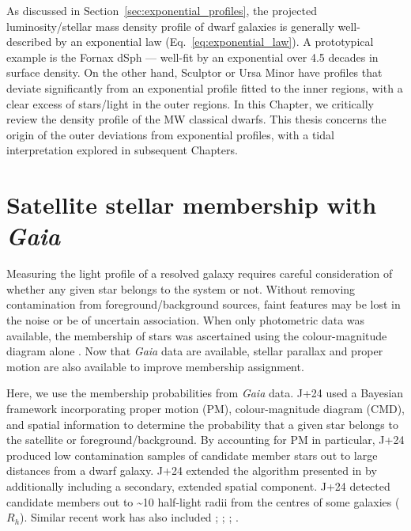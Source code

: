 As discussed in Section~\ref{sec:exponential_profiles}, the projected
luminosity/stellar mass density profile of dwarf galaxies is generally
well-described by an exponential law (Eq.~\ref{eq:exponential_law}). A
prototypical example is the Fornax dSph --- well-fit by an exponential
over 4.5 decades in surface density. On the other hand, Sculptor or Ursa
Minor have profiles that deviate significantly from an exponential
profile fitted to the inner regions, with a clear excess of stars/light
in the outer regions. In this Chapter, we critically review the density
profile of the MW classical dwarfs. This thesis concerns the origin of
the outer deviations from exponential profiles, with a tidal
interpretation explored in subsequent Chapters.

\section{\texorpdfstring{Satellite stellar membership with
\emph{Gaia}}{Satellite stellar membership with Gaia}}\label{sec:the_algorithm}

Measuring the light profile of a resolved galaxy requires careful
consideration of whether any given star belongs to the system or not.
Without removing contamination from foreground/background sources, faint
features may be lost in the noise or be of uncertain association. When
only photometric data was available, the membership of stars was
ascertained using the colour-magnitude diagram alone \citep[e.g.,
matched filter methods like those used by][]{rockosi+2002}. Now that
\emph{Gaia} data are available, stellar parallax and proper motion are
also available to improve membership assignment.

Here, we use the  membership
probabilities from \emph{Gaia} data. J+24 used a Bayesian framework
incorporating proper motion (PM), colour-magnitude diagram (CMD), and
spatial information to determine the probability that a given star
belongs to the satellite or foreground/background. By accounting for PM
in particular, J+24 produced low contamination samples of candidate
member stars out to large distances from a dwarf galaxy. J+24 extended
the algorithm presented in \citet{MV2020a, MV2020b} by additionally
including a secondary, extended spatial component. J+24 detected
candidate members out to \textasciitilde10 half-light radii from the
centres of some galaxies (\(R_h\)). Similar recent work has also
included \citet{pace+li2019}; \citet{battaglia+2022};
\citet{pace+erkal+li2022}; \citet{qi+2022}.

